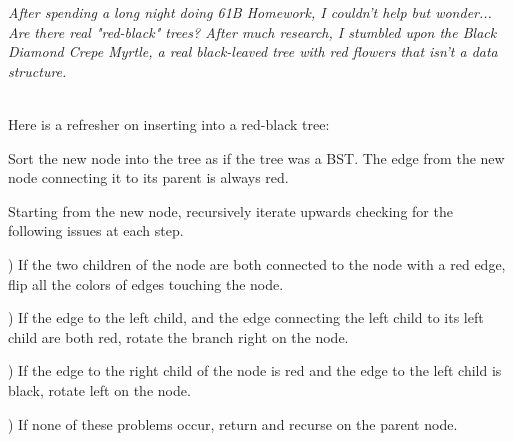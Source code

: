 \emph{After spending a long night doing 61B Homework, I couldn't help but wonder... Are there real "red-black" trees? After much research, I stumbled upon the Black Diamond Crepe Myrtle, a real black-leaved tree with red flowers that isn't a data structure. }
\\
\\
\begin{blocksection}

Here is a refresher on inserting into a red-black tree:
\begin{parts}
\item Sort the new node into the tree as if the tree was a BST. The edge from the new node connecting it to its parent is always red. 

\item Starting from the new node, recursively iterate upwards checking for the following issues at each step. 

) If the two children of the node are both connected to the node         with a red edge, flip all the colors of edges touching the node. 

) If the edge to the left child, and the edge connecting the left         child to its left child are both red, rotate the branch right on the node. 

) If the edge to the right child of the node is red and the edge         to the left child is black, rotate left on the node.

) If none of these problems occur, return and recurse on the             parent node.
\end{parts}
\end{blocksection}
